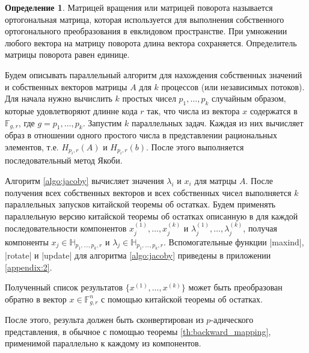 \documentclass[master, och, diploma, times]{sty/SCWorks}
\theoremstyle{plain}
\theoremstyle{definition}
\newtheorem{defn}{Определение}[section]
\numberwithin{equation}{section}
\begin{document}
\begin{defn}
Матрицей вращения или матрицей поворота называется ортогональная матрица, которая используется для выполнения собственного ортогонального преобразования в евклидовом пространстве. При умножении любого вектора на матрицу поворота длина вектора сохраняется. Определитель матрицы поворота равен единице.
\end{defn}

Будем описывать параллельный алгоритм для нахождения собственных значений и собственных векторов матрицы $A$ для $k$ процессов (или независимых потоков). Для начала нужно вычислить $k$ простых чисел $p_1, \dots, p_k$ случайным образом, которые удовлетворяют длинне кода $r$ так, что числа из вектора $x$ содержатся в $\mathbb{F}_{g,r}$, где $g=p_1,\dots,p_k$. 
Запустим $k$ параллельных задач. Каждая из них вычисляет образ в отношении одного простого числа в представлении рациональных элементов, т.е. $H_{p_i,r}(A)$ и $H_{p_i,r}(b)$. После этого выполняется последовательный метод Якоби.

Алгоритм \ref{algo:jacoby} вычисляет значения $\lambda_i$ и $x_i$ для матрцы $A$. После получения всех собственных векторов и всех собственных чисел выполняется $k$ параллельных запусков китайской теоремы об остатках. Будем применять параллельную версию китайской теоремы об остатках описанную в \cite{bib:numbers:limongelli} для каждой последовательности компонентов $x_j^{(1)}, \dots, x_j^{(k)}$ и $\lambda_j^{(1)}, \dots, \lambda_j^{(k)}$, получая компоненты $x_j \in \mathbb{H}_{p_1,\dots,p_k,r}$ и $\lambda_j \in \mathbb{H}_{p_1,\dots,p_k,r}$. Вспомогательные функции |maxind|, |rotate| и |update| для алгоритма \ref{algo:jacoby} приведены в приложении \ref{appendix:2}.

Полученный список результатов $\{x^{(1)},\dots,x^{(k)}\}$ может быть преобразован обратно в вектор $x \in \mathbb{F}_{g,r}^n$ с помощью китайской теоремы об остатках.

После этого, результа должен быть сконвертирован из $p$-адического представления, в обычное с помощью теоремы \ref{th:backward_mapping}, применимой параллельно к каждому из компонентов.
\end{document}
